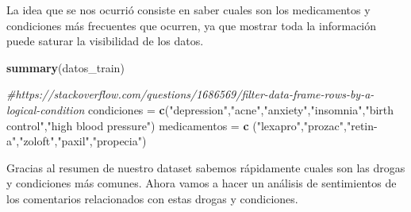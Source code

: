 \documentclass[spanish,]{article}
\newenvironment{Shaded}{\begin{snugshade}}{\end{snugshade}}
\newcommand{\KeywordTok}[1]{\textcolor[rgb]{0.13,0.29,0.53}{\textbf{#1}}}
\newcommand{\StringTok}[1]{\textcolor[rgb]{0.31,0.60,0.02}{#1}}
\newcommand{\CommentTok}[1]{\textcolor[rgb]{0.56,0.35,0.01}{\textit{#1}}}
\newcommand{\NormalTok}[1]{#1}
\begin{document}
La idea que se nos ocurrió consiste en saber cuales son los medicamentos
y condiciones más frecuentes que ocurren, ya que mostrar toda la
información puede saturar la visibilidad de los datos.

\begin{Shaded}
\begin{Highlighting}[]
\KeywordTok{summary}\NormalTok{(datos_train)}

\CommentTok{#https://stackoverflow.com/questions/1686569/filter-data-frame-rows-by-a-logical-condition}
\NormalTok{condiciones =}\StringTok{ }\KeywordTok{c}\NormalTok{(}\StringTok{"depression"}\NormalTok{,}\StringTok{"acne"}\NormalTok{,}\StringTok{"anxiety"}\NormalTok{,}\StringTok{"insomnia"}\NormalTok{,}\StringTok{"birth control"}\NormalTok{,}\StringTok{"high blood pressure"}\NormalTok{)}
\NormalTok{medicamentos =}\StringTok{ }\KeywordTok{c}\NormalTok{ (}\StringTok{"lexapro"}\NormalTok{,}\StringTok{"prozac"}\NormalTok{,}\StringTok{"retin-a"}\NormalTok{,}\StringTok{"zoloft"}\NormalTok{,}\StringTok{"paxil"}\NormalTok{,}\StringTok{"propecia"}\NormalTok{)}
\end{Highlighting}
\end{Shaded}

Gracias al resumen de nuestro dataset sabemos rápidamente cuales son las
drogas y condiciones más comunes. Ahora vamos a hacer un análisis de
sentimientos de los comentarios relacionados con estas drogas y
condiciones.
\end{document}
